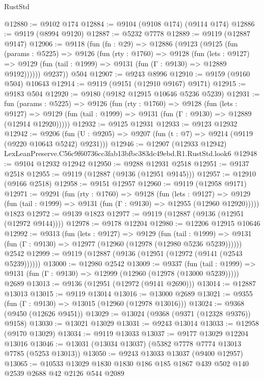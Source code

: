 \begin{lexlean}{RustStd}
\begin{coremodule}
@12880 := @9102 @174
@12884 := @9104 (@9108 @174) (@9114 @174)
@12886 := @9119 (@8994 @9120)
@12887 := @5232 @7778
@12889 := @9119 (@12887 @9147)
@12906 := @9118
    (fun (fn : @29) =>
    @12886
      (@9123
        (@9125
          (fun (params : @5225) =>
          @9126
            (fun (rty : @1760) =>
            @9128
              (fun (lets : @9127) =>
              @9129 (fun (tail : @1999) => @9131 (fun (Γ : @9130) => @12889 @9192))))))
        @9237))
    @504
@12907 := @9243 @8996
@12910 := @9159 (@9160 @504) @10643
@12914 := @9119 (@9151 (@12910 @9167) @9171)
@12915 := @9183 @504
@12920 := @9180 (@9182 @12915 @10646 @5236 @5239)
@12931 := fun (params : @5225) =>
  @9126
    (fun (rty : @1760) =>
    @9128
      (fun (lets : @9127) =>
      @9129 (fun (tail : @1999) => @9131 (fun (Γ : @9130) => @12889 (@12914 @12920)))))
@12932 := @9125 @12931
@12933 := @9123 @12932
@12942 := @9206
    (fun (U : @9205) => @9207 (fun (t : @7) => @9214 (@9119 (@9220 @10643 @5242) @9231)))
@12946 := @12907 (@12933 @12942) LexLeanPreserve.C56c9f60736cc3fab13bfbc383dc49ebd.R1.RustStd.look6
@12948 := @9104 @12932 @12942
@12950 := @9288 @12931 @2518
@12951 := @9137 @2518
@12955 := @9119 (@12887 (@9136 (@12951 @9145)))
@12957 := @12910 (@9166 @2518)
@12958 := @9151 @12957
@12960 := @9119 (@12958 @9171)
@12971 := @9291
    (fun (rty : @1760) =>
    @9128
      (fun (lets : @9127) =>
      @9129 (fun (tail : @1999) => @9131 (fun (Γ : @9130) => @12955 (@12960 @12920)))))
    @1823
@12972 := @9139 @1823
@12977 := @9119 (@12887 (@9136 (@12951 (@12972 @9144))))
@12978 := @9178 @12204
@12980 := @12206 @12915 @10646
@12992 := @9313
    (fun (lets : @9127) =>
    @9129
      (fun (tail : @1999) =>
      @9131 (fun (Γ : @9130) => @12977 (@12960 (@12978 (@12980 @5236 @5239))))))
    @2542
@12999 := @9119 (@12887 (@9136 (@12951 (@12972 (@9141 (@2543 @5239))))))
@13000 := @12980 @2542
@13009 := @9337
    (fun (tail : @1999) => @9131 (fun (Γ : @9130) => @12999 (@12960 (@12978 (@13000 @5239)))))
    @2689
@13013 := @9136 (@12951 (@12972 (@9141 @2690)))
@13014 := @12887 @13013
@13015 := @9119 @13014
@13016 := @13000 @2689
@13021 := @9355 (fun (Γ : @9130) => @13015 (@12960 (@12978 @13016)))
@13024 := @9368 (@9450 (@12626 @9451))
@13029 := @13024 (@9368 (@9371 (@12328 @9376)) @9158)
@13030 := @13021 @13029
@13031 := @9243 @13014
@13033 := @12958 (@9170 @13029)
@13034 := @9119 @13033
@13037 := @9177 @13029 @12204 @13016
@13046 := @13031 (@13034 @13037) (@5382 @7778 @7774 @13013 @7785 (@5253 @13013))
@13050 := @9243 @13033 @13037 (@9400 @12957)
@13065 := @10533 @13029 @1830 @1830 @186 @185 @1867 @439 @502 @140 @2539 @2688 @42 @2126 @544 @2089

\end{coremodule}
\end{lexlean}

